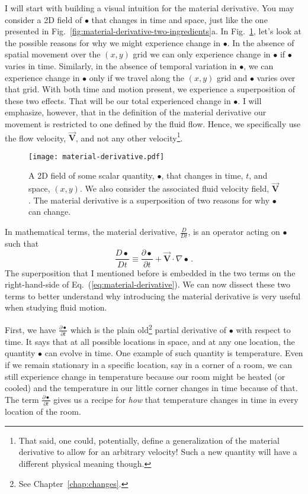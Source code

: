 I will start with building a visual intuition for the material derivative. You may consider a 2D field of $\bullet$ that changes in time and space, just like the one presented in Fig.~\ref{fig:material-derivative-two-ingredients}a. In Fig.~\ref{fig:material-derivative-example}, let's look at the possible reasons for why we might experience change in $\bullet$. In the absence of spatial movement over the $(x,y)$ grid we can only experience change in $\bullet$ if $\bullet$ varies in time. Similarly, in the absence of temporal variation in $\bullet$, we can experience change in $\bullet$ only if we travel along the $(x,y)$ grid and $\bullet$ varies over that grid. With both time and motion present, we experience a superposition of these two effects. That will be our total experienced change in $\bullet$. I will emphasize, however, that in the definition of the material derivative our movement is restricted to one defined by the fluid flow. Hence, we specifically use the flow velocity, $\vec{\bm{V}}$, and not any other velocity\footnote{That said, one could, potentially, define a generalization of the material derivative to allow for an arbitrary velocity! Such a new quantity will have a different physical meaning though.}.
\begin{figure}[H]
\centering\texttt{[image: material-derivative.pdf]}
\caption{A 2D field of some scalar quantity, $\bullet$, that changes in time, $t$, and space, $(x, y)$. We also consider the associated fluid velocity field, $\vec{\bm{V}}$. The material derivative is a superposition of two reasons for why $\bullet$ can change.}			
\label{fig:material-derivative-example}
\end{figure}

In mathematical terms, the material derivative, $\frac{D}{Dt}$, is an operator acting on $\bullet$ such that
\begin{equation} \label{eq:material-derivative}
\frac{D \bullet}{D t} \equiv \frac{\partial \bullet}{\partial t} + \vec{\bm{V}} \cdot \nabla \bullet \, .
\end{equation}
The superposition that I mentioned before is embedded in the two terms on the right-hand-side of Eq.~(\ref{eq:material-derivative}). We can now dissect these two terms to better understand why introducing the material derivative is very useful when studying fluid motion.

First, we have $\frac{\partial \bullet}{\partial t}$ which is the plain old\footnote{See Chapter~\ref{chap:changes}.} partial derivative of $\bullet$ with respect to time. It says that at all possible locations in space, and at any one location, the quantity $\bullet$ can evolve in time. One example of such quantity is temperature. Even if we remain stationary in a specific location, say in a corner of a room, we can still experience change in temperature because our room might be heated (or cooled) and the temperature in our little corner changes in time because of that. The term $\frac{\partial \bullet}{\partial t}$ gives us a recipe for \textit{how} that temperature changes in time in every location of the room.

